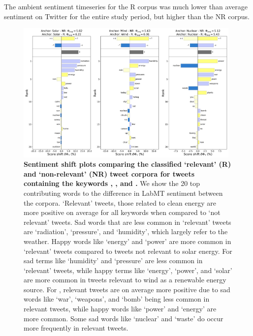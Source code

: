 The ambient sentiment timeseries for the R  corpus was much lower than average sentiment on Twitter for the entire study period,
but higher than the NR corpus.


\begin{figure}
  \centering	
    \includegraphics[width=0.98\textwidth]{figures/combined_shifts.png}  
  \caption{
    \textbf{Sentiment shift plots comparing the classified `relevant' (R) and `non-relevant' (NR) tweet corpora for tweets containing the keywords , , and .}
    We show the 20 top contributing words to the difference in LabMT sentiment between the corpora.
    `Relevant' tweets, those related to clean energy
    are more positive on average for all keywords
    when compared to `not relevant' tweets. 
    Sad words that are less common in `relevant'  tweets are `radiation', `pressure', and `humidity', which largely refer to the weather.
    Happy words like `energy' and `power' are more common in `relevant' tweets compared to tweets not relevant to solar energy. For  sad terms like `humidity' and `pressure' are less common in `relevant' tweets,
    while happy terms like `energy', `power', and `solar' are more common in tweets relevant to wind as a renewable energy source. 
    For , relevant tweets are on average more positive due to sad words like `war', `weapons', and `bomb' being less common in relevant tweets,
    while happy words like `power' and `energy' are more common.
    Some sad words like `nuclear' and `waste' do occur more frequently in relevant tweets.
  }    
  \label{fig:combined_sentiment_shifts}
\end{figure}


